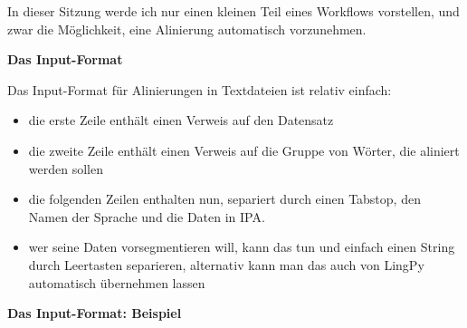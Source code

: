 In dieser Sitzung werde ich nur einen kleinen Teil eines Workflows
vorstellen, und zwar die Möglichkeit, eine Alinierung automatisch
vorzunehmen.




\vspace{0.5cm}\par\noindent\textbf{Das Input-Format}\vspace{0.5cm}

Das Input-Format für Alinierungen in Textdateien ist relativ einfach:

\begin{itemize}
\itemsep1pt\parskip0pt
\item
  die erste Zeile enthält einen Verweis auf den Datensatz
\item
  die zweite Zeile enthält einen Verweis auf die Gruppe von Wörter, die
  aliniert werden sollen
\item
  die folgenden Zeilen enthalten nun, separiert durch einen Tabstop, den
  Namen der Sprache und die Daten in IPA.
\item
  wer seine Daten vorsegmentieren will, kann das tun und einfach einen
  String durch Leertasten separieren, alternativ kann man das auch von
  LingPy automatisch übernehmen lassen
\end{itemize}




\vspace{0.5cm}\par\noindent\textbf{Das Input-Format: Beispiel}\vspace{0.5cm}


